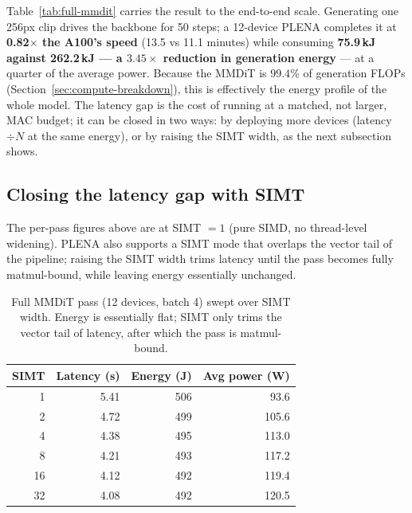 \documentclass[11pt]{report}
\begin{document}
Table~\ref{tab:full-mmdit} carries the result to the end-to-end scale.
Generating one 256px clip drives the backbone for 50 steps; a 12-device
PLENA completes it at \textbf{0.82$\times$ the A100's speed} (13.5 vs
11.1 minutes) while consuming \textbf{75.9\,kJ against 262.2\,kJ --- a
$3.45\times$ reduction in generation energy} --- at a quarter of the average
power. Because the MMDiT is $99.4\%$ of generation FLOPs
(Section~\ref{sec:compute-breakdown}), this is effectively the energy
profile of the whole model. The latency gap is the cost of running at a
matched, not larger, MAC budget; it can be closed in two ways: by deploying
more devices (latency $\div N$ at the same energy), or by raising the SIMT
width, as the next subsection shows.

\subsection{Closing the latency gap with SIMT}
\label{sec:results-simt}

The per-pass figures above are at SIMT $=1$ (pure SIMD, no thread-level
widening). PLENA also supports a SIMT mode that overlaps the vector tail of
the pipeline; raising the SIMT width trims latency until the pass becomes
fully matmul-bound, while leaving energy essentially unchanged.

\begin{table}[h]
\centering
\caption{Full MMDiT pass (12 devices, batch 4) swept over SIMT width.
Energy is essentially flat; SIMT only trims the vector tail of latency,
after which the pass is matmul-bound.}
\label{tab:simt-sweep}
\begin{tabular}{@{}rrrr@{}}
\toprule
SIMT & Latency (s) & Energy (J) & Avg power (W) \\
\midrule
1 & 5.41 & 506 & 93.6 \\
2 & 4.72 & 499 & 105.6 \\
4 & 4.38 & 495 & 113.0 \\
8 & 4.21 & 493 & 117.2 \\
16 & 4.12 & 492 & 119.4 \\
32 & 4.08 & 492 & 120.5 \\
\bottomrule
\end{tabular}
\end{table}
\end{document}
